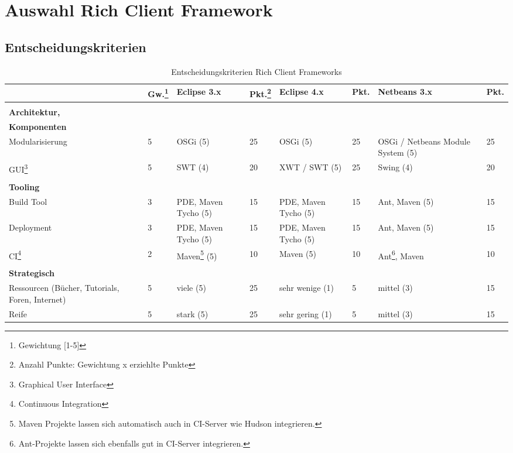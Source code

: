 \chapter{Auswahl Rich Client Framework}\label{rcp_entscheid}
\section{Entscheidungskriterien}
\begin{longtable}{|p{2.8cm}|p{0.7cm}|p{2.1cm}|p{0.7cm}|p{2.1cm}|p{0.7cm}|p{2.2cm}|p{0.7cm}|}
    \caption{Entscheidungskriterien Rich Client Frameworks}\\\hline
  & \textbf{Gw.\footnote{Gewichtung [1-5]}} & \textbf{Eclipse 3.x}& \textbf{Pkt.\footnote{Anzahl Punkte: Gewichtung x erziehlte Punkte}} & \textbf{Eclipse 4.x} &\textbf{Pkt.} & \textbf{Netbeans 3.x}& \textbf{Pkt.}\\\hline
 \multicolumn{8}{|l|}{}\\  
\multicolumn{8}{|l|}{\textbf{Architektur,}}\\
  \multicolumn{8}{|l|}{\textbf{Komponenten}}\\\hline
  Modularisierung &5 & OSGi (5) & 25 & OSGi (5) & 25 & OSGi / Netbeans Module System (5) & 25\\\hline
  GUI\footnote{Graphical User Interface} &5 & SWT (4) & 20 & XWT / SWT (5) & 25 & Swing (4) & 20\\\hline
  \multicolumn{8}{|l|}{}\\
  \multicolumn{8}{|l|}{\textbf{Tooling}}\\\hline
  Build Tool &3 & PDE, Maven Tycho (5) & 15 & PDE, Maven Tycho (5) & 15 & Ant, Maven (5) & 15\\\hline
  Deployment & 3 & PDE, Maven Tycho (5) & 15 & PDE, Maven Tycho (5) & 15 & Ant, Maven (5)& 15\\\hline
 CI\footnote{Continuous Integration} &2 & Maven\footnote{Maven Projekte lassen sich automatisch auch in CI-Server wie Hudson integrieren.} (5) & 10 &Maven (5) & 10& Ant\footnote{Ant-Projekte lassen sich ebenfalls gut in CI-Server integrieren.}, Maven & 10\\\hline 
 \multicolumn{8}{|l|}{}\\
\multicolumn{8}{|l|}{\textbf{Strategisch}}\\\hline
  Ressourcen (Bücher, Tutorials, Foren, Internet) & 5 & viele (5) & 25 & sehr wenige (1) &5&mittel (3)&15 \\\hline
  Reife & 5 & stark (5) & 25 & sehr gering (1) &5&mittel (3)&15 \\\hline

\end{longtable}
